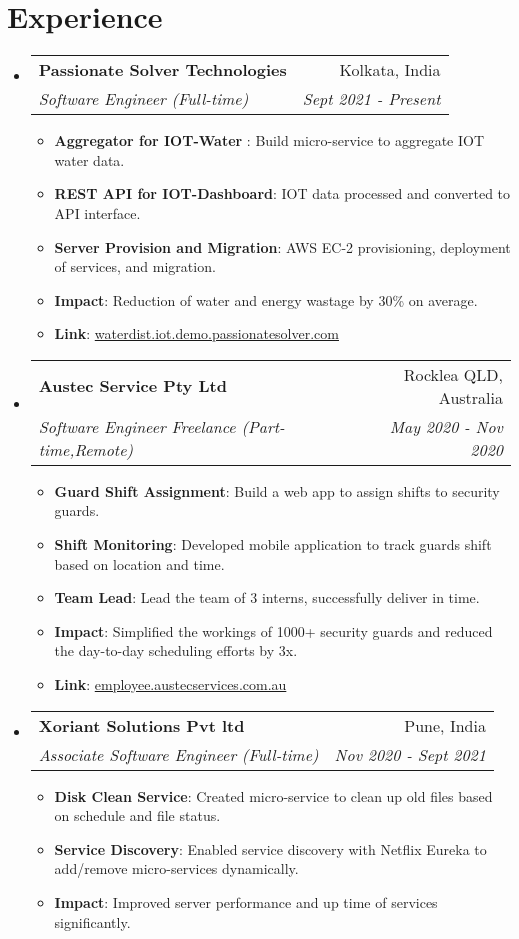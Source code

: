 \documentclass[a4paper,20pt]{article}
\makeatletter
\newcommand{\resumeItem}[2]{
  \item\small{
    \textbf{#1}{: #2 \vspace{-2pt}}
  }
}
\newcommand{\resumeSubheading}[4]{
  \vspace{-1pt}\item
    \begin{tabular*}{0.97\textwidth}{l@{\extracolsep{\fill}}r}
      \textbf{#1} & #2 \\
      \textit{#3} & \textit{#4} \\
    \end{tabular*}\vspace{-5pt}
}
\newcommand{\resumeSubHeadingListStart}{\begin{itemize}[leftmargin=*]}
\newcommand{\resumeSubHeadingListEnd}{\end{itemize}}
\newcommand{\resumeItemListStart}{\begin{itemize}}
\newcommand{\resumeItemListEnd}{\end{itemize}\vspace{-5pt}}
\makeatother
\begin{document}
\section{Experience}
  \resumeSubHeadingListStart
    \resumeSubheading{Passionate Solver Technologies}{Kolkata, India}
    {Software Engineer (Full-time)}{Sept 2021 - Present}
    \resumeItemListStart
        \resumeItem{Aggregator for IOT-Water }
          {Build micro-service to aggregate IOT water data. }
          \resumeItem{REST API for IOT-Dashboard}
          {IOT data processed and converted to API interface.}
          \resumeItem{Server Provision and Migration}{AWS EC-2 provisioning, deployment of services, and migration.}
          \resumeItem{Impact}{Reduction of water and energy wastage by 30\% on average.}
          \resumeItem{Link}{\href{https://waterdist.iot.demo.passionatesolver.com/login}{waterdist.iot.demo.passionatesolver.com}}
      \resumeItemListEnd
      
    \resumeSubheading{Austec Service Pty Ltd}{Rocklea QLD, Australia}
    {Software Engineer Freelance (Part-time,Remote)}{May 2020 - Nov 2020}
    \resumeItemListStart
        \resumeItem{Guard Shift Assignment}
          {Build a web app to assign shifts to security guards.}
          \resumeItem{Shift Monitoring}
          {Developed mobile application to track guards shift based on location and time.}
          \resumeItem{Team Lead}{Lead the team of 3 interns, successfully deliver in time.}
          \resumeItem{Impact}{Simplified the workings of 1000+ security guards and reduced the day-to-day scheduling efforts by 3x.}
          \resumeItem{Link}{\href{http://www.employee.austecservices.com.au}{employee.austecservices.com.au}}
      \resumeItemListEnd  
      
    \resumeSubheading
		{Xoriant Solutions Pvt ltd}{Pune, India}
		{Associate Software Engineer (Full-time)}{Nov 2020 -  Sept 2021}
		\resumeItemListStart
        \resumeItem{Disk Clean Service}
          {Created micro-service to clean up old files based on schedule and file status.}
        \resumeItem{Service Discovery}
          {Enabled service discovery with Netflix Eureka to add/remove micro-services dynamically. }
        \resumeItem{Impact}{Improved server performance and up time of services significantly. }
		\resumeItemListEnd

\resumeSubHeadingListEnd

\vspace{-5pt}
\end{document}
